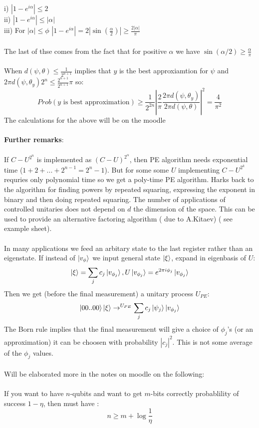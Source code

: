 \documentclass{article}
\begin{document}
{               i) $|1-e^{i \alpha}| \leq 2$\\
               ii) $|1-e^{i \alpha}| \leq |\alpha|$\\
               iii) For $|\alpha| \leq \phi$ $|1- e^{i \alpha}|= 2|\sin( \frac{\alpha}{2})| \geq \frac{2|\alpha|}{\pi}$\\\\
       The last of thse comes from the fact that for positive $\alpha$ we have $\sin(\alpha/2) \geq \frac{\alpha}{\pi}$\\\\
               When $d(\psi, \theta) \leq \frac{1}{2^{n+1}}$ implies that $y$ is the best approxiamtion for $\psi$ and $2\pi d(\psi, \theta_y) 2^n \leq \frac{2^{n+1}}{2^{n+1}} \pi$ so:
               $$
               Prob( y\text{ is best approximation}) \geq \frac{1}{2^{2n}} | \frac{2}{\pi} \frac{2 \pi d(\psi, \theta_y)}{2 \pi d(\psi, \theta)}|^2 = \frac{4}{\pi^2}
               $$
               The calculations for the above will be on the moodle\\\\
               \textbf{Further remarks}:\\\\
               If $C-U^{2^n}$ is implemented as $(C-U)^{2^{\alpha}}$, then PE algorithm needs exponential time ($ 1+ 2+... + 2^{n-1} = 2^{n}-1$). But for some some $U$ implementing $C-U^{2^k}$ requries only polynomial time so we get a poly-time PE algorithm. Harks back to the algorithm for finding powers by repeated squaring, expressing the exponent in binary and then doing repeated squaring. The number of applications of controlled unitaries does not depend on $d$ the dimension of the space. This can be used to provide an alternative factoring algorithm ( due to A.Kitaev) ( see example sheet).\\\\
               In many applications we feed an arbitary state to the last register rather than an eigenstate. If instead of $\ket{v_{\phi}}$ we input general state $\ket{\xi}$, expand in eigenbasis of $U$:
               $$
               \ket{\xi} = \sum_j c_j \ket{v_{\phi_j}}, U \ket{v_{\phi_j}} = e^{2 \pi i \phi_j} \ket{v_{\phi_j}}
               $$
               Then we get (before the final measurement) a unitary process $U_{PE}$:
               $$
               \ket{00..00} \ket{\xi} \rightarrow^{U_{PE}} \sum_j c_j \ket{\psi_j} \ket{v_{\phi_j}}
               $$
               The Born rule implies that the final measurement will give a choice of $\phi_j$'s (or an approximation) it can be choosen with probability $|c_j|^2$. This is not some average of the $\phi_j$ values.\\\\
               Will be elaborated more in the notes on moodle on the following:\\\\
               If you want to have $n$-qubits and want to get $m$-bits correctly probablility of success $1- \eta$, then must have :
               $$
               n \geq m + \log \frac{1}{\eta}
               $$
}
\end{document}
